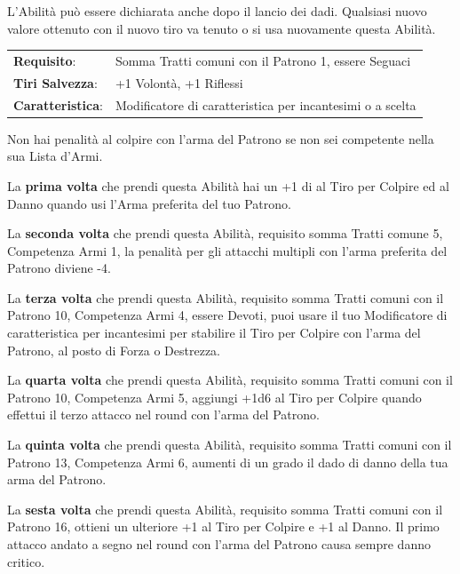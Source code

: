 \begin{multicols}{2}
L'Abilità può essere dichiarata anche dopo il lancio dei dadi. Qualsiasi nuovo valore ottenuto con il nuovo tiro va tenuto o si usa nuovamente questa Abilità.


\hspace{-0.2cm}\begin{tabularx}{\linewidth}{l@{\hspace{8pt}}X}
\rowcolor{gray!20}\textbf{Requisito}: & Somma Tratti comuni con il Patrono 1, essere Seguaci\\
\textbf{Tiri Salvezza}: & +1 Volontà, +1 Riflessi\\
\rowcolor{gray!20}\textbf{Caratteristica}: & Modificatore di caratteristica per incantesimi o a scelta\\
\end{tabularx}\smallskip

Non hai penalità al colpire con l'arma del Patrono se non sei competente nella sua Lista d'Armi.

La \textbf{prima volta} che prendi questa Abilità hai un +1 di al Tiro per Colpire ed al Danno quando usi l'Arma preferita del tuo Patrono.

La \textbf{seconda volta} che prendi questa Abilità, requisito somma Tratti comune 5, Competenza Armi 1, la penalità per gli attacchi multipli con l'arma preferita del Patrono diviene -4.

La \textbf{terza volta} che prendi questa Abilità, requisito somma Tratti comuni con il Patrono 10, Competenza Armi 4, essere Devoti, puoi usare il tuo Modificatore di caratteristica per incantesimi per stabilire il Tiro per Colpire con l'arma del Patrono, al posto di Forza o Destrezza.

La \textbf{quarta volta} che prendi questa Abilità, requisito somma Tratti comuni con il Patrono 10, Competenza Armi 5, aggiungi +1d6 al Tiro per Colpire quando effettui il terzo attacco nel round con l'arma del Patrono.

La \textbf{quinta volta} che prendi questa Abilità, requisito somma Tratti comuni con il Patrono 13, Competenza Armi 6, aumenti di un grado il dado di danno della tua arma del Patrono.

La \textbf{sesta volta} che prendi questa Abilità, requisito somma Tratti comuni con il Patrono 16, ottieni un ulteriore +1 al Tiro per Colpire e +1 al Danno. Il primo attacco andato a segno nel round con l'arma del Patrono causa sempre danno critico.



\end{multicols}
